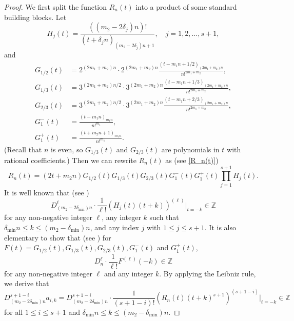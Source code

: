 \documentclass[11pt]{amsart}
\numberwithin{equation}{section}
\begin{document}
\begin{proof}
We first split the function $R_n(t)$ into a product of some standard building blocks. Let
\[ H_j(t) =  \frac{((m_2-2\delta_j)n)!}{(t+\delta_jn)_{(m_2-2\delta_j)n+1}}, \quad j=1,2,\ldots,s+1,\]
and
\begin{align*}
G_{1/2}(t) &= 2^{(2m_1+m_2)n} \cdot 2^{(2m_1+m_2)n}\frac{(t-m_1n+1/2)_{(2m_1+m_2)n}}{n!^{2m_1+m_2}}, \\
G_{1/3}(t) &= 3^{(2m_1+m_2)n/2} \cdot 3^{(2m_1+m_2)n}\frac{(t-m_1n+1/3)_{(2m_1+m_2)n}}{n!^{2m_1+m_2}}, \\
G_{2/3}(t) &= 3^{(2m_1+m_2)n/2} \cdot 3^{(2m_1+m_2)n}\frac{(t-m_1n+2/3)_{(2m_1+m_2)n}}{n!^{2m_1+m_2}}, \\
G_{1}^{-}(t) &= \frac{(t-m_1n)_{m_1n}}{n!^{m_1}}, \\
G_1^{+}(t) &= \frac{(t+m_2n+1)_{m_1n}}{n!^{m_1}}.
\end{align*}
(Recall that $n$ is even, so $G_{1/3}(t)$ and $G_{2/3}(t)$ are polynomials in $t$ with rational coefficients.) Then we can rewrite $R_n(t)$ as (see \eqref{R_n(t)})
\begin{equation}\label{R=GGGHHH}
R_n(t) = (2t+m_2n)G_{1/2}(t)G_{1/3}(t)G_{2/3}(t)G_{1}^{-}(t)G_1^{+}(t)  \prod_{j=1}^{s+1} H_j(t).
\end{equation}
It is well known that (see \cite[Lemma 16]{Zu04})
\[ D_{(m_2-2\delta_{\min})n}^{\ell} \cdot \frac{1}{\ell!} \left( H_j(t)(t+k) \right)^{(\ell)} \big|_{t=-k} \in \mathbb{Z} \]
for any non-negative integer $\ell$, any integer $k$ such that $\delta_{\min}n \leqslant k \leqslant (m_2-\delta_{\min})n$, and any index $j$ with $1 \leqslant j \leqslant s+1$. It is also elementary to show that (see \cite[Propsition 3.2]{LY20}) for $F(t) = G_{1/2}(t), G_{1/3}(t), G_{2/3}(t), G_{1}^{-}(t)$ and $G_1^{+}(t)$,
\[ D_{n}^{\ell} \cdot \frac{1}{\ell!} F^{(\ell)}(-k) \in \mathbb{Z} \]
for any non-negative integer $\ell$ and any integer $k$. By applying the Leibniz rule, we derive that
\begin{equation}\label{weak_arithmetic_lemma}
D_{(m_2-2\delta_{\min})n}^{s+1-i} a_{i,k} = D_{(m_2-2\delta_{\min})n}^{s+1-i} \cdot \frac{1}{(s+1-i)!} \left( R_n(t)(t+k)^{s+1} \right)^{(s+1-i)} \big|_{t=-k} \in \mathbb{Z}
\end{equation}
for all $1 \leqslant i \leqslant s+1$ and $\delta_{\min}n \leqslant k \leqslant (m_2-\delta_{\min})n$.


\end{proof}
\end{document}
